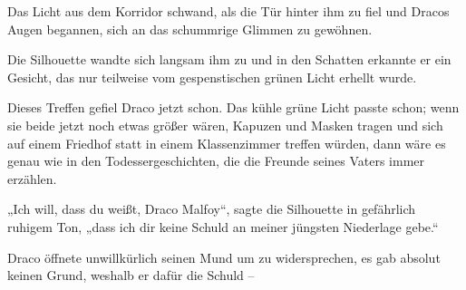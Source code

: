 Das Licht aus dem Korridor schwand, als die Tür hinter ihm zu fiel und Dracos Augen begannen, sich an das schummrige Glimmen zu gewöhnen.

Die Silhouette wandte sich langsam ihm zu und in den Schatten erkannte er ein Gesicht, das nur teilweise vom gespenstischen grünen Licht erhellt wurde.

Dieses Treffen gefiel Draco jetzt schon. Das kühle grüne Licht passte schon; wenn sie beide jetzt noch etwas größer wären, Kapuzen und Masken tragen und sich auf einem Friedhof statt in einem Klassenzimmer treffen würden, dann wäre es genau wie in den Todessergeschichten, die die Freunde seines Vaters immer erzählen.

„Ich will, dass du weißt, Draco Malfoy“, sagte die Silhouette in gefährlich ruhigem Ton, „dass ich dir keine Schuld an meiner jüngsten Niederlage gebe.“

Draco öffnete unwillkürlich seinen Mund um zu widersprechen, es gab absolut keinen Grund, weshalb er dafür die Schuld –

